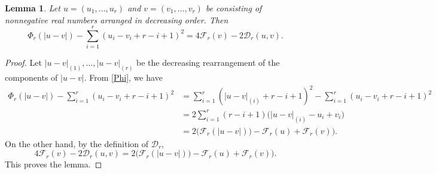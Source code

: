\documentclass[11pt]{amsart}
\theoremstyle{plain}
\newtheorem{lemma}[thm]{Lemma}
\theoremstyle{definition}
\newcommand{\caD}{\mathcal{D}}
\newcommand{\caF}{\mathcal{F}}
\begin{document}
\begin{lemma}\label{lemma-Phi-Dr}
		Let $u=(u_1,\dots,u_r)$ and $v=(v_1,\dots,v_r)$ be consisting of nonnegative real numbers arranged in decreasing order. Then
		\begin{equation}\label{Phi-Dr}
			\Phi_r(|u-v|)-\sum_{i=1}^r(u_i-v_i+r-i+1)^2=4\caF_r(v)-2\caD_r(u,v).
		\end{equation}
\end{lemma}
\begin{proof}
	Let $|u-v|_{(1)},\dots,|u-v|_{(r)}$ be the decreasing rearrangement of the components of $|u-v|$. From \eqref{Phi}, we have
	\begin{align*}
\Phi_r(|u-v|)-\sum_{i=1}^r(u_i-v_i+r-i+1)^2 &= \sum_{i=1}^r(|u-v|_{(i)}+r-i+1)^2 - \sum_{i=1}^r(u_i-v_i+r-i+1)^2 \\
&= 2\sum_{i=1}^r(r-i+1)\big(|u-v|_{(i)}-u_i+v_i\big)\\
&=2\big(\caF_r(|u-v|))-\caF_r(u)+\caF_r(v)\big).
\end{align*}
	On the other hand, by the definition of $\caD_r$,
	\[4\caF_r(v)-2\caD_r(u,v)=2\big(\caF_r(|u-v|))-\caF_r(u)+\caF_r(v)\big).\]
	This proves the lemma.
\end{proof}
\end{document}
